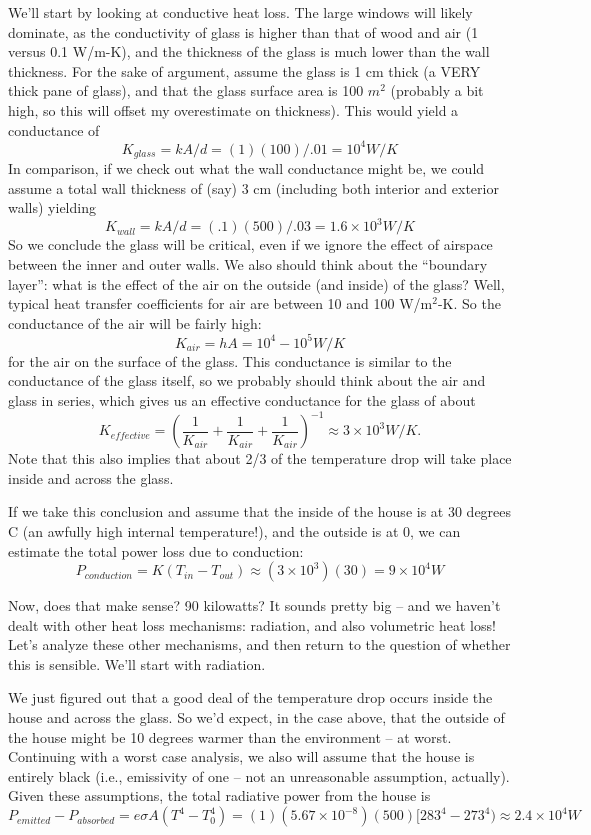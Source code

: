 \documentclass[10pt]{book}
\begin{document}
We'll start by looking at conductive heat loss.  The large windows will likely dominate, as the conductivity of glass is higher than that of wood and air (1 versus 0.1 W/m-K), and the thickness of the glass is much lower than the wall thickness.  For the sake of argument, assume the glass is 1 cm thick (a VERY thick pane of glass), and that the glass surface area is 100 $m^2$ (probably a bit high, so this will offset my overestimate on thickness).  This would yield a conductance of 
$$ K_{glass} = k A/d = (1) (100)/.01 = 10^4 W/K$$
In comparison, if we check out what the wall conductance might be, we could assume a total wall thickness of (say) 3 cm (including both interior and exterior walls) yielding
$$ K_{wall} = k A/d = (.1) (500)/.03 = 1.6\times 10^3 W/K$$
So we conclude the glass will be critical, even if we ignore the effect of airspace between the inner and outer walls.
We also should think about the ``boundary layer'':  what is the effect of the air on the outside (and inside) of the glass?  Well, typical heat transfer coefficients for air are between 10 and 100 W/m$^2$-K.  So the conductance of the air will be fairly high:
$$K_{air} = hA = 10^4 - 10^5 W/K$$
for the air on the surface of the glass.  This conductance is similar to the conductance of the glass itself, so we probably should think about the air and glass in series, which gives us an effective conductance for the glass of about
$$K_{effective} = (\frac{1}{K_{air}}+\frac{1}{K_{air}}+\frac{1}{K_{air}})^{-1} \approx 3 \times 10^3 W/K.$$
Note that this also implies that about 2/3 of the temperature drop will take place inside and across the glass.

If we take this conclusion and assume that the inside of the house is at 30 degrees C (an awfully high internal temperature!), and the outside is at 0, we can estimate the total power loss due to conduction:
$$P_{conduction} = K(T_{in}-T_{out}) \approx (3 \times 10^3)(30) = 9 \times 10^4 W$$ 

Now, does that make sense?  90 kilowatts? It sounds pretty big -- and we haven't dealt with other heat loss mechanisms: radiation, and also volumetric heat loss! Let's analyze these other mechanisms, and then return to the question of whether this is sensible. We'll start with radiation.

We just figured out that a good deal of the temperature drop occurs inside the house and across the glass.  So we'd expect, in the case above, that the outside of the house might be 10 degrees warmer than the environment -- at worst.  Continuing with a worst case analysis, we also will assume that the house is entirely black (i.e., emissivity of one -- not an unreasonable assumption, actually).  Given these assumptions, the total radiative power from the house is
$$P_{emitted} -P_{absorbed}= e \sigma A (T^4-T_0^4) = (1) (5.67\times 10^{-8})(500)[283^4-273^4) \approx 2.4 \times 10^4W$$
\end{document}
